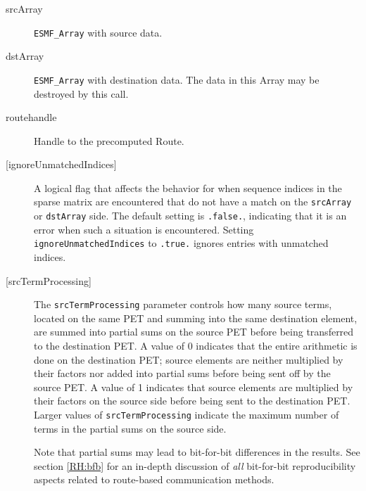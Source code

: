      \begin{description}
  
     \item [srcArray]
       {\tt ESMF\_Array} with source data.
  
     \item [dstArray]
       {\tt ESMF\_Array} with destination data. The data in this Array may be
       destroyed by this call.
  
     \item [routehandle]
       Handle to the precomputed Route.
  
     \item [{[ignoreUnmatchedIndices]}]
       A logical flag that affects the behavior for when sequence indices 
       in the sparse matrix are encountered that do not have a match on the 
       {\tt srcArray} or {\tt dstArray} side. The default setting is 
       {\tt .false.}, indicating that it is an error when such a situation is 
       encountered. Setting {\tt ignoreUnmatchedIndices} to {\tt .true.} ignores
       entries with unmatched indices.
  
     \item [{[srcTermProcessing]}]
       The {\tt srcTermProcessing} parameter controls how many source terms,
       located on the same PET and summing into the same destination element,
       are summed into partial sums on the source PET before being transferred
       to the destination PET. A value of 0 indicates that the entire arithmetic
       is done on the destination PET; source elements are neither multiplied 
       by their factors nor added into partial sums before being sent off by the
       source PET. A value of 1 indicates that source elements are multiplied
       by their factors on the source side before being sent to the destination
       PET. Larger values of {\tt srcTermProcessing} indicate the maximum number
       of terms in the partial sums on the source side.
  
       Note that partial sums may lead to bit-for-bit differences in the results.
       See section \ref{RH:bfb} for an in-depth discussion of {\em all}
       bit-for-bit reproducibility aspects related to route-based communication
       methods.
  

\end{description}
